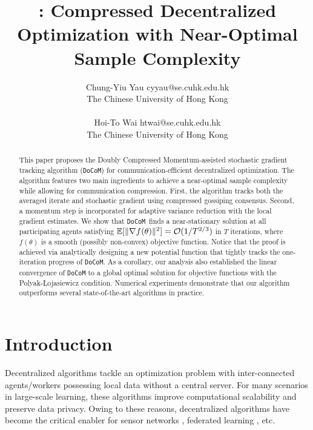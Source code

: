 \documentclass[10pt]{article} %
\title{{\aname}: Compressed Decentralized Optimization with Near-Optimal Sample Complexity}
\author{\name Chung-Yiu Yau \email cyyau@se.cuhk.edu.hk \\ \addr The Chinese University of Hong Kong
      \\ \AND \\
      \name Hoi-To Wai \email htwai@se.cuhk.edu.hk \\ \addr The Chinese University of Hong Kong}
\theoremstyle{plain}
\theoremstyle{definition}
\theoremstyle{remark}
\newcommand{\aname}{{\tt DoCoM}}
\begin{document}
\maketitle

\begin{abstract}
This paper proposes the Doubly Compressed Momentum-assisted stochastic gradient tracking algorithm (\aname) for communication-efficient decentralized optimization. The algorithm features two main ingredients to achieve a near-optimal sample complexity while allowing for communication compression. First, the algorithm tracks both the averaged iterate and stochastic gradient using compressed gossiping consensus. Second, a momentum step is incorporated for adaptive variance reduction with the local gradient estimates. We show that \aname~finds a near-stationary solution at all participating agents satisfying $\mathbb{E}[ \| \nabla f( \theta ) \|^2 ] = {\cal O}( 1 / T^{2/3} )$ in $T$ iterations, where $f(\theta)$ is a smooth (possibly non-convex) objective function. Notice that the proof is achieved via analytically designing a new potential function that tightly tracks the one-iteration progress of {\aname}. As a corollary, our analysis also established the linear convergence of {\aname} to a global optimal solution for objective functions with the Polyak-Łojasiewicz condition. Numerical experiments demonstrate that our algorithm outperforms several state-of-the-art algorithms in practice.
\end{abstract}

\section{Introduction}\vspace{-.1cm}
Decentralized algorithms tackle an optimization problem with inter-connected agents/workers possessing local data without  a central server. For many scenarios in large-scale learning, these algorithms improve computational scalability and preserve data privacy. Owing to these reasons, decentralized algorithms have become the critical enabler for  
sensor networks \citep{schizas2007consensus},
federated learning \citep{konevcny2016federated, wang2021field}, etc. 
\end{document}
